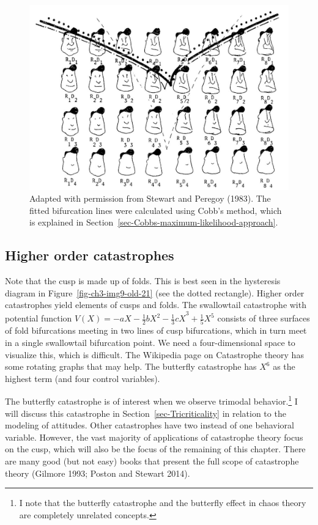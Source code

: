 \documentclass[
  a4paper,
  DIV=11,
  numbers=noendperiod,
  oneside]{scrreprt}
\begin{document}
\begin{figure}

{\centering \includegraphics{media/ch3/image14.jpg}

}

\caption{\label{fig-ch3-img14-old-26}Adapted with permission from
Stewart and Peregoy (1983). The fitted bifurcation lines were calculated
using Cobb's method, which is explained in
Section~\ref{sec-Cobbs-maximum-likelihood-approach}.}

\end{figure}

\hypertarget{sec-Higher-order-catastrophes}{%
\subsection{Higher order
catastrophes}\label{sec-Higher-order-catastrophes}}

Note that the cusp is made up of folds. This is best seen in the
hysteresis diagram in Figure~\ref{fig-ch3-img9-old-21} (see the dotted
rectangle). Higher order catastrophes yield elements of cusps and folds.
The swallowtail catastrophe with potential function
\(V(X) = {- aX - \frac{1}{2}bX^{2} - \frac{1}{3}cX}^{3} + \frac{1}{5}X^{5}\)
consists of three surfaces of fold bifurcations meeting in two lines of
cusp bifurcations, which in turn meet in a single swallowtail
bifurcation point. We need a four-dimensional space to visualize this,
which is difficult. The Wikipedia page on Catastrophe theory has some
rotating graphs that may help. The butterfly catastrophe has \(X^{6}\)
as the highest term (and four control variables).

The butterfly catastrophe is of interest when we observe trimodal
behavior.\footnote{I note that the butterfly catastrophe and the
  butterfly effect in chaos theory are completely unrelated concepts.} I
will discuss this catastrophe in Section~\ref{sec-Tricriticality} in
relation to the modeling of attitudes. Other catastrophes have two
instead of one behavioral variable. However, the vast majority of
applications of catastrophe theory focus on the cusp, which will also be
the focus of the remaining of this chapter. There are many good (but not
easy) books that present the full scope of catastrophe theory (Gilmore
1993; Poston and Stewart 2014).
\end{document}
